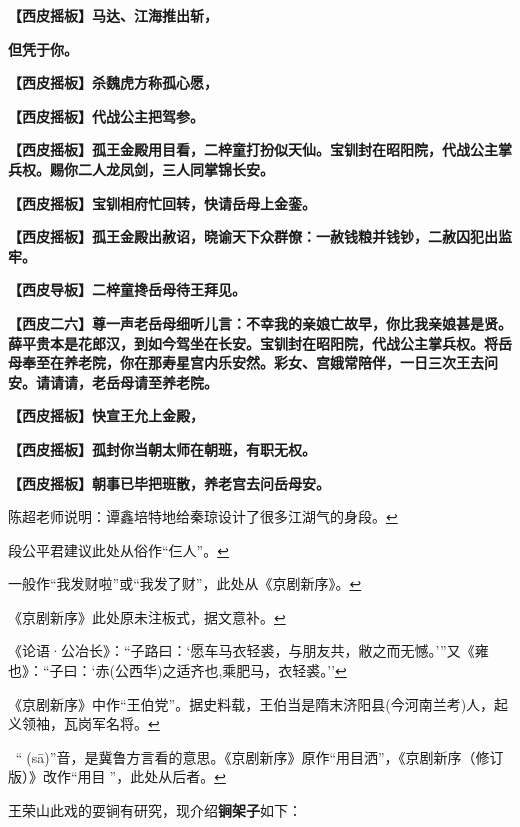 \textbf{【西皮摇板】马达、江海推出斩，}

\textbf{但凭于你。}

\textbf{【西皮摇板】杀魏虎方称孤心愿，}

\textbf{【西皮摇板】代战公主把驾参。}

\textbf{【西皮摇板】孤王金殿用目看，二梓童打扮似天仙。宝钏封在昭阳院，代战公主掌兵权。赐你二人龙凤剑，三人同掌锦长安。}

\textbf{【西皮摇板】宝钏相府忙回转，快请岳母上金銮。}

\textbf{【西皮摇板】孤王金殿出赦诏，晓谕天下众群僚：一赦钱粮并钱钞，二赦囚犯出监牢。}

\textbf{【西皮导板】二梓童搀岳母待王拜见。}

\textbf{【西皮二六】尊一声老岳母细听儿言：不幸我的亲娘亡故早，你比我亲娘甚是贤。薛平贵本是花郎汉，到如今驾坐在长安。宝钏封在昭阳院，代战公主掌兵权。将岳母奉至在养老院，你在那寿星宫内乐安然。彩女、宫娥常陪伴，一日三次王去问安。请请请，老岳母请至养老院。}

\textbf{【西皮摇板】快宣王允上金殿，}

\textbf{【西皮摇板】孤封你当朝太师在朝班，有职无权。}

\textbf{【西皮摇板】朝事已毕把班散，养老宫去问岳母安。}


\item
  \leavevmode\hypertarget{fn307}{}%
  陈超老师说明：谭鑫培特地给秦琼设计了很多江湖气的身段。\protect\hyperlink{fnref307}{↩}
\item
  \leavevmode\hypertarget{fn308}{}%
  段公平君建议此处从俗作``仨人''。\protect\hyperlink{fnref308}{↩}
\item
  \leavevmode\hypertarget{fn309}{}%
  一般作``我发财啦''或``我发了财''，此处从《京剧新序》。\protect\hyperlink{fnref309}{↩}
\item
  \leavevmode\hypertarget{fn310}{}%
  《京剧新序》此处原未注板式，据文意补。\protect\hyperlink{fnref310}{↩}
\item
  \leavevmode\hypertarget{fn311}{}%
  《论语·公冶长》：``子路曰：`愿车马衣轻裘，与朋友共，敝之而无憾。'''又《雍也》：``子曰：`赤(公西华)之适齐也,乘肥马，衣轻裘。''\protect\hyperlink{fnref311}{↩}
\item
  \leavevmode\hypertarget{fn312}{}%
  《京剧新序》中作``王伯党''。据史料载，王伯当是隋末济阳县(今河南兰考)人，起义领袖，瓦岗军名将。\protect\hyperlink{fnref312}{↩}
\item
  \leavevmode\hypertarget{fn313}{}%
  {\fzsong 𥋌}念``撒(sā)''音，是冀鲁方言看的意思。《京剧新序》原作``用目洒''，《京剧新序（修订版）》改作``用目{\fzsong 𥋌}''，此处从后者。\protect\hyperlink{fnref313}{↩}
\item
  \leavevmode\hypertarget{fn314}{}%
  王荣山此戏的耍锏有研究，现介绍\textbf{锏架子}如下：

